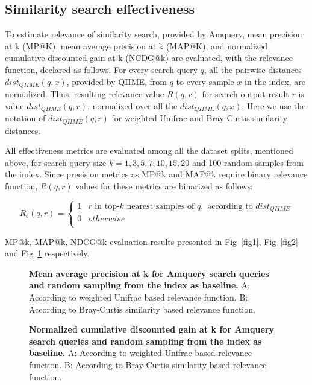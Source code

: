 \documentclass[10pt,letterpaper]{article}
\begin{document}
\subsection*{Similarity search effectiveness}
To estimate relevance of similarity search, provided by Amquery, mean precision at k (MP@K), mean average precision at k (MAP@K), and normalized cumulative discounted gain at k (NCDG@k) \cite{book, jarvelin2000ir, jarvelin2002cumulated}
are evaluated, with the relevance function, declared as follows. For every search query $q$, all the pairwise distances $dist_{QIIME}(q, x)$, provided by QIIME, from $q$ to every sample $x$ in the index, are normalized. 
Thus, resulting relevance value $R(q, r)$ for search output result $r$ is value $dist_{QIIME}(q, r)$, normalized over all the $dist_{QIIME}(q, x)$. Here we use the notation of $dist_{QIIME}(q, r)$ for weighted Unifrac and Bray-Curtis similarity distances.

All effectiveness metrics are evaluated among all the dataset splits, mentioned above, for search query size $k = {1, 3, 5, 7, 10, 15, 20}$ and 100 random samples from the index. Since precision metrics as MP@k and MAP@k require binary relevance function,
$R(q, r)$ values for these metrics are binarized as follows:

\[ R_b(q, r)  =
  \begin{cases}
    1  & r \text{ in top-} k \text{ nearest samples of } q, \text{ according to } dist_{QIIME}\\
    0  &  otherwise \\
  \end{cases}
\] 

MP@k, MAP@k, NDCG@k evaluation results presented in Fig~\ref{fig1}, Fig~\ref{fig2} and Fig~\ref{fig3} respectively.


\begin{figure}[!h]
\caption{{\bf Mean average precision at k for Amquery search queries and random sampling from the index as baseline.}
A: According to weighted Unifrac based relevance function. B: According to Bray-Curtis similarity based relevance function.}
\label{fig3}
\end{figure}

\begin{figure}[!h]
\caption{{\bf Normalized cumulative discounted gain at k for Amquery search queries and random sampling from the index as baseline.}
A: According to weighted Unifrac based relevance function. B: According to Bray-Curtis similarity based relevance function.}
\label{fig4}
\end{figure}
\end{document}
